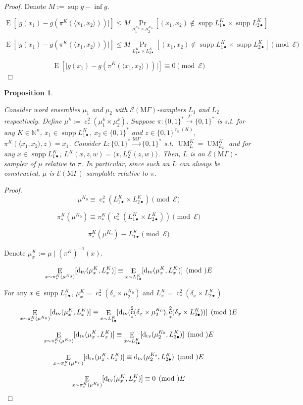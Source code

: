 \documentclass{article}
\numberwithin{equation}{section}
\theoremstyle{definition}
\theoremstyle{plain}
\newtheorem{proposition}{Proposition}[section]
\newcommand{\Bool}{\{0,1\}}
\newcommand{\Words}{{\Bool^*}}
\DeclareMathOperator{\Supp}{supp}
\DeclareMathOperator{\Prb}{Pr}
\DeclareMathOperator{\E}{E}
\DeclareMathOperator{\R}{r}
\DeclareMathOperator{\UM}{UM}
\DeclareMathOperator{\En}{c}
\newcommand{\Dtv}{\operatorname{d}_{\textnormal{tv}}}
\newcommand{\Nats}{\mathbb{N}}
\newcommand{\Abs}[1]{\lvert #1 \rvert}
\newcommand{\Chev}[1]{\langle #1 \rangle}
\newcommand{\MGrow}{\mathrm{M}\Gamma}
\newcommand{\Fall}{\mathcal{E}}
\newcommand{\EMG}{\Fall(\MGrow)}
\newcommand{\Scheme}{\xrightarrow{\Gamma}}
\newcommand{\MScheme}{\xrightarrow{\MGrow}}
\begin{document}
\begin{proof}

Denote $M:= \sup g - \inf g$.

$$\E[\Abs{g(x_1)-g(\pi^{K}(\Chev{x_1,x_2}))}] \leq M \Prb_{ \mu_1^{K_0} \times \mu_2^{K_0}}[(x_1,x_2) \not\in \Supp L_{1\bullet}^{K} \times \Supp L_{2\bullet}^{K}]$$

$$\E[\Abs{g(x_1)-g(\pi^{K}(\Chev{x_1,x_2}))}] \leq M\Prb_{ L_{1\bullet}^{K} \times L_{2\bullet}^{K}}[(x_1,x_2) \not\in \Supp L_{1\bullet}^{K} \times \Supp L_{2\bullet}^{K}] \pmod \Fall$$

$$\E[\Abs{g(x_1)-g(\pi^{K}(\Chev{x_1,x_2}))}] \equiv 0 \pmod \Fall$$
\end{proof}
\begin{samepage}
\begin{proposition}
\label{prp:smp_base_change}

Consider word ensembles $\mu_1$ and $\mu_2$ with $\EMG$-samplers $L_1$ and $L_2$ respectively. Define ${\mu^k:=\En_*^2(\mu_1^k \times \mu_2^k)}$. Suppose ${\pi: \Words \Scheme \Words}$ is s.t. for any $K \in \Nats^n$, $x_1 \in \Supp L_{1\bullet}^{K}$, ${x_2 \in \Words}$ and $z \in \Bool^{\R_\pi(K)}$, ${\pi^{K}(\Chev{x_1,x_2},z)=x_1}$. Consider $L: \Words \MScheme \Words$ s.t. $\UM_L^{K}=\UM_{L_2}^{K}$ and for any $x \in \Supp L_{1\bullet}^{K}$, ${L^{K}(x,z,w)=\Chev{x,L_2^{K}(z,w)}}$. Then, $L$ is an $\EMG$-sampler of $\mu$ relative to $\pi$. In particular, since such an $L$ can always be constructed, $\mu$ is $\EMG$-samplable relative to $\pi$.

\end{proposition}
\end{samepage}

\begin{proof}

\[\mu^{K_0} \equiv \En_*^2(L_{1\bullet}^K \times L_{2\bullet}^K)\pmod \Fall\]

\[\pi_*^K(\mu^{K_0}) \equiv \pi_*^K(\En_*^2(L_{1\bullet}^K \times L_{2\bullet}^K)) \pmod \Fall\] 

\[\pi_*^K(\mu^{K_0}) \equiv  L_{1\bullet}^K \pmod \Fall\]

Denote $\mu_x^K:=\mu \mid (\pi^K)^{-1}(x)$.

\[\E_{x \sim \pi_*^K(\mu^{K_0})}[\Dtv(\mu_x^K,L_x^K)] \equiv \E_{x \sim L_{1\bullet}^K}[\Dtv(\mu_x^K,L_x^K)] \pmod \Fall\]

For any $x \in \Supp L_{1\bullet}^{K}$, $\mu_x^K = \En_*^2(\delta_x \times \mu_2^{K_0})$ and $L_x^K=\En_*^2(\delta_x \times L_{2\bullet}^K)$.

\[\E_{x \sim \pi_*^K(\mu^{K_0})}[\Dtv(\mu_x^K,L_x^K)] \equiv \E_{x \sim L_{1\bullet}^K}[\Dtv(\En_*^2(\delta_x \times \mu_2^{K_0}),\En_*^2(\delta_x \times L_{2\bullet}^K))] \pmod \Fall\]

\[\E_{x \sim \pi_*^K(\mu^{K_0})}[\Dtv(\mu_x^K,L_x^K)] \equiv \E_{x \sim L_{1\bullet}^K}[\Dtv(\mu_2^{K_0},L_{2\bullet}^K)] \pmod \Fall\]

\[\E_{x \sim \pi_*^K(\mu^{K_0})}[\Dtv(\mu_x^K,L_x^K)] \equiv \Dtv(\mu_2^{K_0},L_{2\bullet}^K) \pmod \Fall\]

\[\E_{x \sim \pi_*^K(\mu^{K_0})}[\Dtv(\mu_x^K,L_x^K)] \equiv 0 \pmod \Fall\]
\end{proof}
\end{document}
